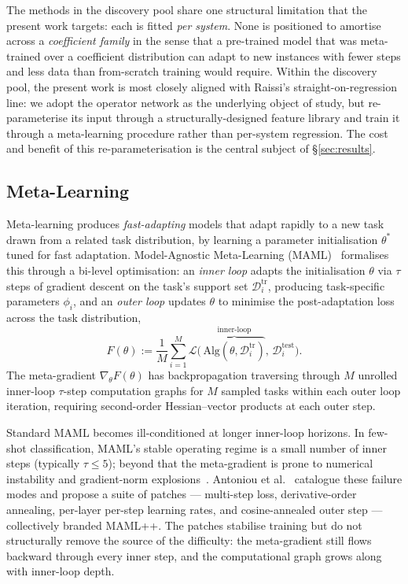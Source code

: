 \documentclass[10pt,journal,compsoc]{IEEEtran}
\begin{document}
The methods in the discovery pool share one structural limitation that the
present work targets: each is fitted \emph{per system}. None is positioned to
amortise across a \emph{coefficient family} in the sense that a pre-trained
model that was meta-trained over a coefficient distribution can adapt to new
instances with fewer steps and less data than from-scratch training would
require. Within the discovery pool, the present work is most closely aligned
with Raissi's straight-on-regression line: we adopt the operator network as the
underlying object of study, but re-parameterise its input through a
structurally-designed feature library and train it through a meta-learning
procedure rather than per-system regression. The cost and benefit of this
re-parameterisation is the central subject of \S\ref{sec:results}.

\subsection{Meta-Learning}\label{subsec:meta_learning}

Meta-learning produces \emph{fast-adapting} models that adapt rapidly to a
new task drawn from a related task distribution, by learning a parameter
initialisation $\theta^*$ tuned for fast adaptation. Model-Agnostic
Meta-Learning (MAML)~\cite{finn2017} formalises this through a bi-level
optimisation: an \emph{inner loop} adapts the initialisation $\theta$ via
$\tau$ steps of gradient descent on the task's support set
$\mathcal{D}^{\text{tr}}_i$, producing task-specific parameters $\phi_i$, and
an \emph{outer loop} updates $\theta$ to minimise the post-adaptation loss
across the task distribution,
%
\begin{equation}\label{eq:maml_outer}
F(\theta) := \frac{1}{M}\sum_{i=1}^{M}\mathcal{L}\bigl(\,
\overbrace{\text{Alg}(\theta, \mathcal{D}^{\text{tr}}_i)}^{\text{inner-loop}},\,
\mathcal{D}^{\text{test}}_i \bigr).
\end{equation}
%
The meta-gradient $\nabla_\theta F(\theta)$ has backpropagation traversing
through $M$ unrolled inner-loop $\tau$-step computation graphs for $M$ sampled
tasks within each outer loop iteration, requiring second-order Hessian--vector
products at each outer step.

Standard MAML becomes ill-conditioned at longer inner-loop horizons.
In few-shot classification, MAML's stable operating regime is a small
number of inner steps (typically $\tau \leq 5$); beyond that the
meta-gradient is prone to numerical instability and gradient-norm
explosions~\cite{antoniou2019}. Antoniou et
al.~\cite{antoniou2019} catalogue these failure modes and
propose a suite of patches --- multi-step loss, derivative-order
annealing, per-layer per-step learning rates, and cosine-annealed
outer step --- collectively branded MAML++. The patches stabilise
training but do not structurally remove the source of the difficulty:
the meta-gradient still flows backward through every inner step, and
the computational graph grows along with inner-loop depth.
\end{document}
